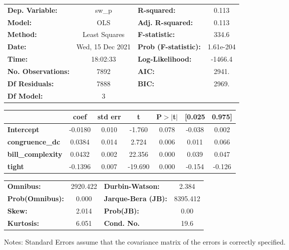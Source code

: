 \begin{center}
\begin{tabular}{lclc}
\toprule
\textbf{Dep. Variable:}    &      sw\_p       & \textbf{  R-squared:         } &     0.113   \\
\textbf{Model:}            &       OLS        & \textbf{  Adj. R-squared:    } &     0.113   \\
\textbf{Method:}           &  Least Squares   & \textbf{  F-statistic:       } &     334.6   \\
\textbf{Date:}             & Wed, 15 Dec 2021 & \textbf{  Prob (F-statistic):} & 1.61e-204   \\
\textbf{Time:}             &     18:02:33     & \textbf{  Log-Likelihood:    } &   -1466.4   \\
\textbf{No. Observations:} &        7892      & \textbf{  AIC:               } &     2941.   \\
\textbf{Df Residuals:}     &        7888      & \textbf{  BIC:               } &     2969.   \\
\textbf{Df Model:}         &           3      & \textbf{                     } &             \\
\bottomrule
\end{tabular}
\begin{tabular}{lcccccc}
                          & \textbf{coef} & \textbf{std err} & \textbf{t} & \textbf{P$> |$t$|$} & \textbf{[0.025} & \textbf{0.975]}  \\
\midrule
\textbf{Intercept}        &      -0.0180  &        0.010     &    -1.760  &         0.078        &       -0.038    &        0.002     \\
\textbf{congruence\_dc}   &       0.0384  &        0.014     &     2.724  &         0.006        &        0.011    &        0.066     \\
\textbf{bill\_complexity} &       0.0432  &        0.002     &    22.356  &         0.000        &        0.039    &        0.047     \\
\textbf{tight}            &      -0.1396  &        0.007     &   -19.690  &         0.000        &       -0.154    &       -0.126     \\
\bottomrule
\end{tabular}
\begin{tabular}{lclc}
\textbf{Omnibus:}       & 2920.422 & \textbf{  Durbin-Watson:     } &    2.384  \\
\textbf{Prob(Omnibus):} &   0.000  & \textbf{  Jarque-Bera (JB):  } & 8395.412  \\
\textbf{Skew:}          &   2.014  & \textbf{  Prob(JB):          } &     0.00  \\
\textbf{Kurtosis:}      &   6.051  & \textbf{  Cond. No.          } &     19.6  \\
\bottomrule
\end{tabular}
\end{center}

Notes: \newline
 [1] Standard Errors assume that the covariance matrix of the errors is correctly specified.